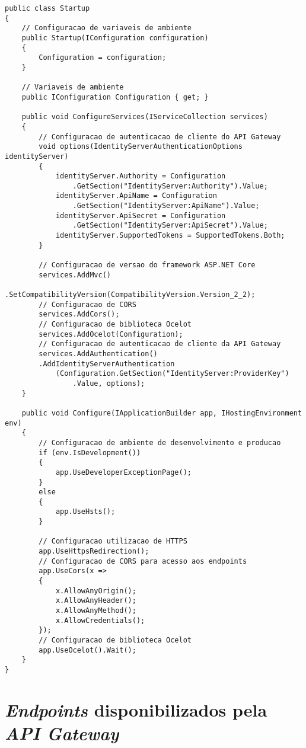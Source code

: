 \begin{lstlisting}[language={[Sharp]C}, label=gateway-configuracao]
public class Startup
{
    // Configuracao de variaveis de ambiente
    public Startup(IConfiguration configuration)
    {
        Configuration = configuration;
    }

    // Variaveis de ambiente
    public IConfiguration Configuration { get; }

    public void ConfigureServices(IServiceCollection services)
    {
        // Configuracao de autenticacao de cliente do API Gateway
        void options(IdentityServerAuthenticationOptions identityServer)
        {
            identityServer.Authority = Configuration
                .GetSection("IdentityServer:Authority").Value;
            identityServer.ApiName = Configuration
                .GetSection("IdentityServer:ApiName").Value;
            identityServer.ApiSecret = Configuration
                .GetSection("IdentityServer:ApiSecret").Value;
            identityServer.SupportedTokens = SupportedTokens.Both;
        }

        // Configuracao de versao do framework ASP.NET Core
        services.AddMvc()
            .SetCompatibilityVersion(CompatibilityVersion.Version_2_2);
        // Configuracao de CORS
        services.AddCors();
        // Configuracao de biblioteca Ocelot
        services.AddOcelot(Configuration);
        // Configuracao de autenticacao de cliente da API Gateway
        services.AddAuthentication()
        .AddIdentityServerAuthentication
            (Configuration.GetSection("IdentityServer:ProviderKey")
                .Value, options);
    }

    public void Configure(IApplicationBuilder app, IHostingEnvironment env)
    {
        // Configuracao de ambiente de desenvolvimento e producao
        if (env.IsDevelopment())
        {
            app.UseDeveloperExceptionPage();
        }
        else
        {
            app.UseHsts();
        }

        // Configuracao utilizacao de HTTPS
        app.UseHttpsRedirection();
        // Configuracao de CORS para acesso aos endpoints
        app.UseCors(x =>
        {
            x.AllowAnyOrigin();
            x.AllowAnyHeader();
            x.AllowAnyMethod();
            x.AllowCredentials();
        });
        // Configuracao de biblioteca Ocelot
        app.UseOcelot().Wait();
    }
}
\end{lstlisting}

\section{\textit{Endpoints} disponibilizados pela \textit{API Gateway}}

